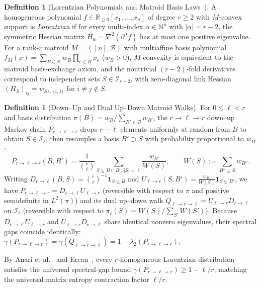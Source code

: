 \documentclass[11pt,a4paper]{article}
\theoremstyle{definition}
\newtheorem{definition}[theorem]{Definition}
\theoremstyle{remark}
\newcommand{\RR}{\mathbb{R}}
\newcommand{\NN}{\mathbb{N}}
\begin{document}
\begin{definition}[Lorentzian Polynomials and Matroid Basis Laws~\cite{branden2020lorentzian}]
A homogeneous polynomial $f \in \RR_{\ge 0}[x_1,\dots,x_n]$ of degree $r \ge 2$ with $M$-convex support is \emph{Lorentzian} if for every multi-index $\alpha \in \NN^n$ with $|\alpha| = r - 2$, the symmetric Hessian matrix $H_\alpha = \nabla^2 (\partial^\alpha f)$ has at most one positive eigenvalue. For a rank-$r$ matroid $M = ([n], \mathcal{B})$ with multiaffine basis polynomial $f_M(x) = \sum_{B \in \mathcal{B}} w_B \prod_{e\in B} x_e$ ($w_B > 0$), $M$-convexity is equivalent to the matroid basis-exchange axiom, and the nontrivial $(r-2)$-fold derivatives correspond to independent sets $S \in \mathcal{I}_{r-2}$, with zero-diagonal link Hessian $(H_S)_{ij} = w_{S \cup \{i,j\}}$ for $i \neq j \notin S$.
\end{definition}

\begin{definition}[Down--Up and Dual Up--Down Matroid Walks]
For $0 \le \ell < r$ and basis distribution $\pi(B) = w_B / \sum_{B'\in\mathcal{B}} w_{B'}$, the $r \to \ell \to r$ down--up Markov chain $P_{r\to\ell\to r}$ drops $r-\ell$ elements uniformly at random from $B$ to obtain $S \in \mathcal{I}_\ell$, then resamples a basis $B' \supset S$ with probability proportional to $w_{B'}$:
\begin{equation}
  P_{r\to\ell\to r}(B, B') = \frac{1}{\binom{r}{\ell}} \sum_{S \subseteq B \cap B',\, |S|=\ell} \frac{w_{B'}}{W(S)}, \qquad W(S) := \sum_{B'' \supseteq S} w_{B''}.
\end{equation}
Writing $D_{r\to\ell}(B, S) = \binom{r}{\ell}^{-1}\mathbf{1}_{S\subseteq B}$ and $U_{\ell\to r}(S, B') = \frac{w_{B'}}{W(S)}\mathbf{1}_{S\subseteq B'}$, we have $P_{r\to\ell\to r} = D_{r\to\ell} U_{\ell\to r}$ (reversible with respect to $\pi$ and positive semidefinite in $L^2(\pi)$) and its dual up--down walk $Q_{\ell\to r\to\ell} = U_{\ell\to r} D_{r\to\ell}$ on $\mathcal{I}_\ell$ (reversible with respect to $\pi_\ell(S) = W(S)/\sum_{S'} W(S')$). Because $D_{r\to\ell} U_{\ell\to r}$ and $U_{\ell\to r} D_{r\to\ell}$ share identical nonzero eigenvalues, their spectral gaps coincide identically: $\gamma(P_{r\to\ell\to r}) = \gamma(Q_{\ell\to r\to\ell}) = 1 - \lambda_2(P_{r\to\ell\to r})$.
\end{definition}

By Anari et al.~\cite{anari2019logconcave2} and Ercan~\cite{ercan2026lorentzian}, every $r$-homogeneous Lorentzian distribution satisfies the universal spectral-gap bound $\gamma(P_{r\to\ell\to r}) \ge 1 - \ell/r$, matching the universal matrix entropy contraction factor $\ell/r$.
\end{document}
